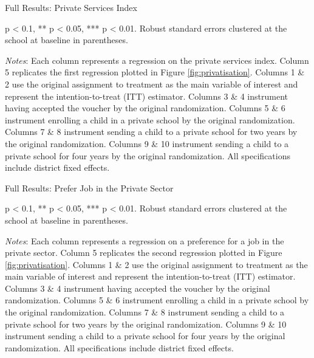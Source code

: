 \documentclass[hidelinks, 12pt, titlepage]{article}
\begin{document}
				\begin{landscape}

				\begin{table}
					\begin{threeparttable}
						\centering
						\caption{Full Results: Private Services Index\label{table:appendixprivateservices}}
						
						\begin{tablenotes}
							\item * p < 0.1, ** p < 0.05, *** p < 0.01. Robust standard errors clustered at the school at baseline in parentheses.
							\item \emph{Notes}: Each column represents a regression on the private services index.  Column 5 replicates the first regression plotted in Figure \ref{fig:privatisation}.  Columns 1 \& 2 use the original assignment to treatment as the main variable of interest and represent the intention-to-treat (ITT) estimator.  Columns 3 \& 4 instrument having accepted the voucher by the original randomization.  Columns 5 \& 6 instrument enrolling a child in a private school by the original randomization.  Columns 7 \& 8 instrument sending a child to a private school for two years by the original randomization.  Columns 9 \& 10 instrument sending a child to a private school for four years by the original randomization.  All specifications include district fixed effects.
						\end{tablenotes}
					\end{threeparttable}
				\end{table}

				\clearpage

				\begin{table}
					\begin{threeparttable}
						\centering
						\caption{Full Results: Prefer Job in the Private Sector\label{table:appendixprivatesectorjob}}
						
						\begin{tablenotes}
							\item * p < 0.1, ** p < 0.05, *** p < 0.01. Robust standard errors clustered at the school at baseline in parentheses.
							\item \emph{Notes}: Each column represents a regression on a preference for a job in the private sector.  Column 5 replicates the second regression plotted in Figure \ref{fig:privatisation}.  Columns 1 \& 2 use the original assignment to treatment as the main variable of interest and represent the intention-to-treat (ITT) estimator.  Columns 3 \& 4 instrument having accepted the voucher by the original randomization.  Columns 5 \& 6 instrument enrolling a child in a private school by the original randomization.  Columns 7 \& 8 instrument sending a child to a private school for two years by the original randomization.  Columns 9 \& 10 instrument sending a child to a private school for four years by the original randomization.  All specifications include district fixed effects.
						\end{tablenotes}
					\end{threeparttable}
				\end{table}


\end{landscape}
\end{document}
